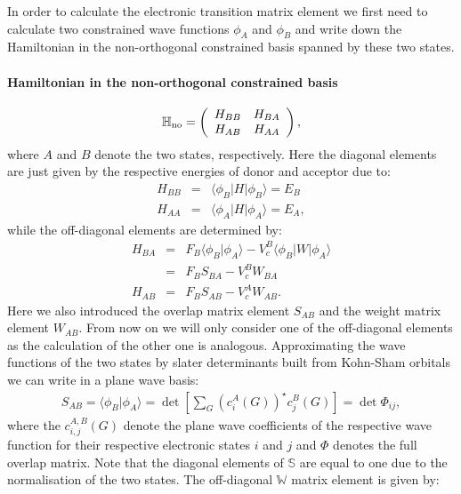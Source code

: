 \documentclass[twoside,10pt,titlepage,a4paper]{article}
\begin{document}
In order to calculate the electronic transition matrix element we first need to calculate two constrained wave functions $\phi_A$ and $\phi_B$ and write down the Hamiltonian in the non-orthogonal constrained basis spanned by these two states. 

\paragraph{Hamiltonian in the non-orthogonal constrained basis}
\begin{equation}
\mathbb{H}_\text{no}=\left(\begin{array}{c c} H_{BB} & H_{BA}\\ H_{AB} & H_{AA}\end{array}\right),
\end{equation}
where $A$ and $B$ denote the two states, respectively. Here the diagonal elements are just given by the respective energies of donor and acceptor due to:
\begin{eqnarray}
H_{BB}&=&\langle \phi_B \vert H \vert \phi_B \rangle=E_B \\
H_{AA}&=&\langle \phi_A \vert H \vert \phi_A \rangle=E_A,
\end{eqnarray}
while the off-diagonal elements are determined by:
\begin{eqnarray}
H_{BA}&=&F_B \langle \phi_B \vert \phi_A \rangle -V_c^B \langle \phi_B \vert W\vert \phi_A \rangle\\
&=& F_B S_{BA} -V_c^B W_{BA}\\
H_{AB}&=&F_B S_{AB} -V_c^A W_{AB}.
\end{eqnarray}
Here we also introduced the overlap matrix element $S_{AB}$ and the weight matrix element $W_{AB}$. From now on we will only consider one of the off-diagonal elements as the calculation of the other one is analogous.
Approximating the wave functions of the two states by slater determinants built from Kohn-Sham orbitals we can write in a plane wave basis:
\begin{eqnarray}
S_{AB}=\langle \phi_B \vert \phi_A \rangle= \det \left[\sum_G (c_i^A(G))^\star c_j^B(G)\right]=\det \Phi_{ij},
\end{eqnarray}
where the $c_{i,j}^{A,B}(G)$ denote the plane wave coefficients of the respective wave function for
their respective electronic states $i$ and $j$ and $\Phi$ denotes the full overlap matrix. Note that
the diagonal elements of $\mathbb{S}$ are equal to one due to the normalisation of the two states.
The off-diagonal $\mathbb{W}$ matrix element is given by:
\end{document}
